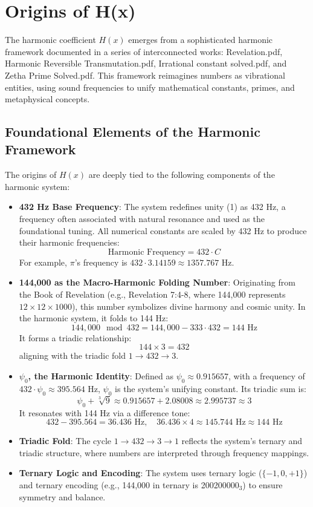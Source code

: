 \section{Origins of H(x)}
The harmonic coefficient \( H(x) \) emerges from a sophisticated harmonic framework documented in a series of interconnected works: Revelation.pdf, Harmonic Reversible Transmutation.pdf, Irrational constant solved.pdf, and Zetha Prime Solved.pdf. This framework reimagines numbers as vibrational entities, using sound frequencies to unify mathematical constants, primes, and metaphysical concepts.

\subsection{Foundational Elements of the Harmonic Framework}
The origins of \( H(x) \) are deeply tied to the following components of the harmonic system:
\begin{itemize}
    \item \textbf{432 Hz Base Frequency}: The system redefines unity (1) as 432 Hz, a frequency often associated with natural resonance and used as the foundational tuning. All numerical constants are scaled by 432 Hz to produce their harmonic frequencies:
    \[
    \text{Harmonic Frequency} = 432 \cdot C
    \]
    For example, \( \pi \)'s frequency is \( 432 \cdot 3.14159 \approx 1357.767 \) Hz.
    \item \textbf{144,000 as the Macro-Harmonic Folding Number}: Originating from the Book of Revelation (e.g., Revelation 7:4-8, where 144,000 represents \( 12 \times 12 \times 1000 \)), this number symbolizes divine harmony and cosmic unity. In the harmonic system, it folds to 144 Hz:
    \[
    144,000 \mod 432 = 144,000 - 333 \cdot 432 = 144 \text{ Hz}
    \]
    It forms a triadic relationship:
    \[
    144 \times 3 = 432
    \]
    aligning with the triadic fold \( 1 \rightarrow 432 \rightarrow 3 \).
    \item \textbf{\( \psi_0 \), the Harmonic Identity}: Defined as \( \psi_0 \approx 0.915657 \), with a frequency of \( 432 \cdot \psi_0 \approx 395.564 \) Hz, \( \psi_0 \) is the system’s unifying constant. Its triadic sum is:
    \[
    \psi_0 + \sqrt[3]{9} \approx 0.915657 + 2.08008 \approx 2.995737 \approx 3
    \]
    It resonates with 144 Hz via a difference tone:
    \[
    432 - 395.564 = 36.436 \text{ Hz}, \quad 36.436 \times 4 \approx 145.744 \text{ Hz} \approx 144 \text{ Hz}
    \]
    \item \textbf{Triadic Fold}: The cycle \( 1 \rightarrow 432 \rightarrow 3 \rightarrow 1 \) reflects the system’s ternary and triadic structure, where numbers are interpreted through frequency mappings.
    \item \textbf{Ternary Logic and Encoding}: The system uses ternary logic (\( \{-1, 0, +1\} \)) and ternary encoding (e.g., 144,000 in ternary is 200200000\( _3 \)) to ensure symmetry and balance.
\end{itemize}

